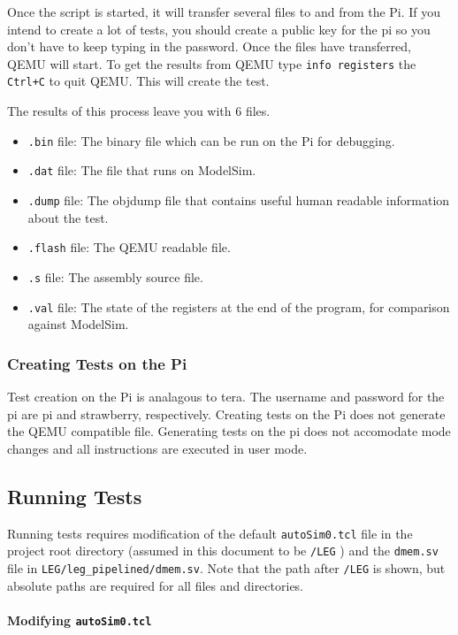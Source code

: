 Once the script is started, it will transfer several files to and from the Pi. If you intend to create a lot of tests, you should create a public key for the pi so you don't have to keep typing in the password. Once the files have transferred, QEMU will start. To get the results from QEMU type \texttt{info registers} the \texttt{Ctrl+C} to quit QEMU. This will create the test. 

The results of this process leave you with 6 files. 
\begin{itemize}
\item \texttt{.bin} file: The binary file which can be run on the Pi for debugging. 
\item \texttt{.dat} file: The file that runs on ModelSim. 
\item \texttt{.dump} file: The objdump file that contains useful human readable information about the test.
\item \texttt{.flash} file: The QEMU readable file. 
\item \texttt{.s} file: The assembly source file.
\item \texttt{.val} file: The state of the registers at the end of the program, for comparison against ModelSim. 
\end{itemize}

\subsubsection{Creating Tests on the Pi}
Test creation on the Pi is analagous to tera. 
The username and password for the pi are pi and strawberry, respectively. Creating tests on the Pi does not generate the QEMU compatible file. Generating tests on the pi does not accomodate mode changes and all instructions are executed in user mode. 
\subsection{Running Tests}

Running tests requires modification of the default \texttt{autoSim0.tcl} 
file in the project root directory (assumed in this document to be \texttt{/LEG} )
and the \texttt{dmem.sv} file in \texttt{LEG/leg\_pipelined/dmem.sv}. 
Note that the path after \texttt{/LEG} is shown, but absolute paths are 
required for all files and directories.
\\\\
\large \textbf{Modifying \texttt{autoSim0.tcl}}

